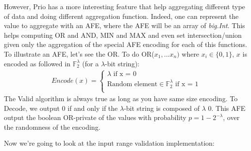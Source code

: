 \documentclass{article}
\begin{document}
However, Prio has a more interesting feature that help aggregating different type of data and doing different aggregation function. Indeed, one can represent the value to aggregate with an AFE, where the AFE will be an array of \textit{big.Int}. This helps computing OR and AND, MIN and MAX and even set intersection/union given only the aggregation of the special AFE encoding for each of this functions.\\
To illustrate an AFE, let's see the OR. To do OR($x_1,...x_n)$ where $x_i \in \{0,1\} $, $x$ is encoded as followed in $\mathbb{F}_2^{\lambda}$ (for a $\lambda$-bit string):
\begin{align*}
    Encode(x)=\left\{
                \begin{array}{ll}
                  \lambda		\text{                                          if x = 0}\\
                  \text{Random element} \in \mathbb{F}^{\lambda}_{2}		\text{											if x = 1}\\
                \end{array}
              \right.
\end{align*}
The Valid algorithm is always true as long as you have same size encoding. To Decode, we output 0 if and only if the $\lambda$-bit string is composed of $\lambda$ 0. This AFE output the boolean OR-private of the values with probability $p = 1- 2^{-\lambda}$, over the randomness of the encoding.



Now we're going to look at the input range validation implementation:
\end{document}
